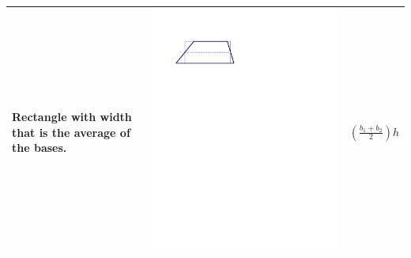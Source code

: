 \documentclass{ximera}
\begin{document}
\begin{problem}
{\begin{tabular}{|>{\centering\arraybackslash}m{2.5cm}|>{\centering\arraybackslash}m{9.5cm}|c|}
Rectangle with width that is the average of the bases. & \includegraphics[scale=0.7]{./graphics/trapezoid2.pdf} & $\left(\frac{b_1+b_2}{2}\right)h$ \\ \hline

\end{tabular}}
\end{problem}
\end{document}
